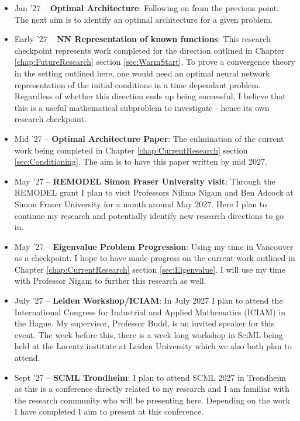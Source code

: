 \documentclass[11pt, onecolumn]{report}
\begin{document}
\begin{itemize}
	\item Jan '27 -- \textbf{Optimal Architecture}: Following on from the previous point. The next aim is to identify an optimal architecture for a given problem.
	
	\item Early '27 -- \textbf{NN Representation of known functions}: This research checkpoint represents work completed for the direction outlined in Chapter \ref{chap:FutureResearch} section \ref{sec:WarmStart}. To prove a convergence theory in the setting outlined here, one would need an optimal neural network representation of the initial conditions in a time dependant problem. Regardless of whether this direction ends up being successful, I believe that this is a useful mathematical subproblem to investigate - hence its own research checkpoint.
	
	\item Mid '27 -- \textbf{Optimal Architecture Paper}: The culmination of the current work being completed in Chapter \ref{chap:CurrentResearch} section \ref{sec:Conditioning}. The aim is to have this paper written by mid 2027.
	
	\item May '27 -- \textbf{REMODEL Simon Fraser University visit}: Through the REMODEL grant I plan to visit Professors Nilima Nigam and Ben Adcock at Simon Fraser University for a month around May 2027. Here I plan to continue my research and potentially identify new research directions to go in.
	
	\item May '27 -- \textbf{Eigenvalue Problem Progression}: Using my time in Vancouver as a checkpoint. I hope to have made progress on the current work outlined in Chapter \ref{chap:CurrentResearch} section \ref{sec:Eigenvalue}. I will use my time with Professor Nigam to further this research as well.
	
	\item July '27 -- \textbf{Leiden Workshop/ICIAM}: In July 2027 I plan to attend the International Congress for Industrial and Applied Mathematics (ICIAM) in the Hague. My supervisor, Professor Budd, is an invited speaker for this event. The week before this, there is a week long workshop in SciML being held at the Lorentz institute at Leiden University which we also both plan to attend.
	
	\item Sept '27 -- \textbf{SCML Trondheim}: I plan to attend SCML 2027 in Trondheim as this is a conference directly related to my research and I am familiar with the research community who will be presenting here. Depending on the work I have completed I aim to present at this conference. 
	

\end{itemize}
\end{document}
